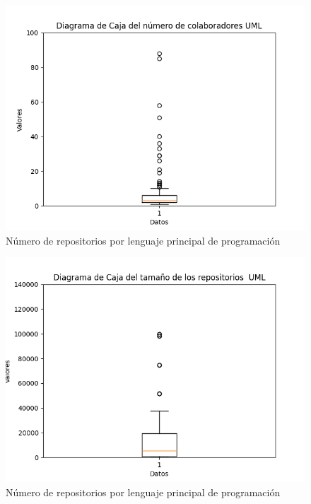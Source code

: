 \documentclass[a4paper, 12pt]{book}
\begin{document}
\begin{figure}
  \centering
  \includegraphics[width=12cm, keepaspectratio]{img/Figure_contributorsUML.png}
  \caption{Número de repositorios por lenguaje principal de programación}\label{fig:Figure_contributors_nouml.png}
\end{figure}

\begin{figure}
  \centering
  \includegraphics[width=12cm, keepaspectratio]{img/Figure_sizeUML.png}
  \caption{Número de repositorios por lenguaje principal de programación}\label{fig:Figure_sizeUML}
\end{figure}
\end{document}
